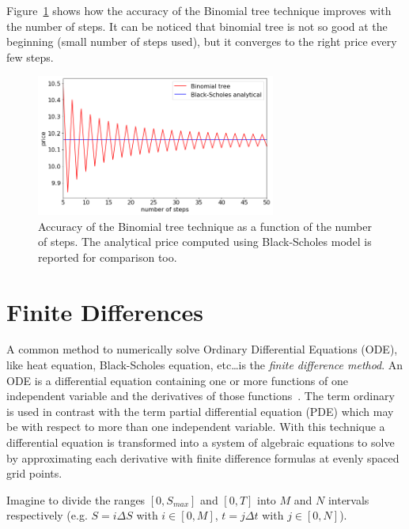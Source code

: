 Figure~\ref{fig:binomial_tree_accuracy} shows how the accuracy of the Binomial tree technique improves with the number of steps.
It can be noticed that binomial tree is not so good at the beginning (small number of steps used), but it converges to the right price every few steps. 

\begin{figure}[htb]
	\centering
	\includegraphics[width=0.7\textwidth]{figures/binomial_tree_accuracy}
	\caption{Accuracy of the Binomial tree technique as a function of the number of steps. The analytical price computed using Black-Scholes model is reported for comparison too.}
	\label{fig:binomial_tree_accuracy}
\end{figure} 

\section{Finite Differences} 
\label{sec:finite_difference}
A common method to numerically solve Ordinary Differential Equations (ODE), like heat equation, Black-Scholes equation, etc\ldots is the \emph{finite difference method}. An ODE is a differential equation containing one or more functions of one independent variable and the derivatives of those functions~\cite{bib:ode}. The term ordinary is used in contrast with the term partial differential equation (PDE) which may be with respect to more than one independent variable.
With this technique a differential equation is transformed into a system of algebraic equations to solve by approximating each derivative with finite difference formulas at evenly spaced grid points.

Imagine to divide the ranges $[0, S_{max}]$ and $[0, T]$ into $M$ and $N$ intervals respectively (e.g. $S = i\Delta S$ with $i\in[0, M]$, $t = j\Delta t$ with $j \in[0,N]$).

